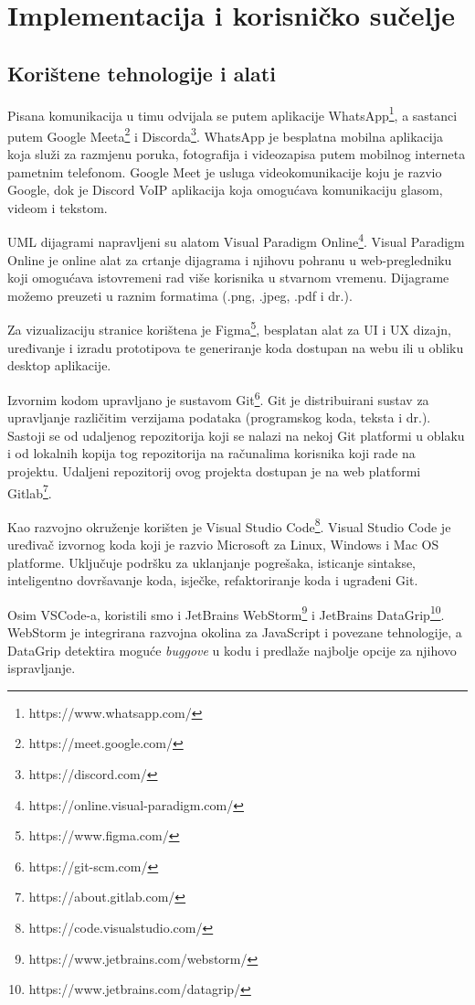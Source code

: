 \chapter{Implementacija i korisničko sučelje}
		
		
		\section{Korištene tehnologije i alati}
		Pisana komunikacija u timu odvijala se putem aplikacije WhatsApp\footnote{https://www.whatsapp.com/}, a sastanci putem Google Meeta\footnote{https://meet.google.com/} i Discorda\footnote{https://discord.com/}. WhatsApp je besplatna mobilna aplikacija koja služi za razmjenu poruka, fotografija i videozapisa putem mobilnog interneta pametnim telefonom. Google Meet je usluga videokomunikacije koju je razvio Google, dok je Discord VoIP aplikacija koja omogućava komunikaciju glasom, videom i tekstom.
		
		UML dijagrami napravljeni su alatom Visual Paradigm Online\footnote{https://online.visual-paradigm.com/}. Visual Paradigm Online je online alat za crtanje dijagrama i njihovu pohranu u web-pregledniku koji omogućava istovremeni rad više korisnika u stvarnom vremenu. Dijagrame možemo preuzeti u raznim formatima (.png, .jpeg, .pdf i dr.).
		
		Za vizualizaciju stranice korištena je Figma\footnote{https://www.figma.com/}, besplatan alat za UI i UX dizajn, uređivanje i izradu	prototipova te generiranje koda dostupan na webu ili u obliku desktop aplikacije.
		
		Izvornim kodom upravljano je sustavom Git\footnote{https://git-scm.com/}. Git je distribuirani sustav za upravljanje različitim	verzijama podataka (programskog koda, teksta i dr.). Sastoji se od udaljenog repozitorija koji se nalazi na nekoj Git platformi u oblaku i od lokalnih kopija tog repozitorija na računalima korisnika koji rade na projektu. Udaljeni repozitorij ovog projekta dostupan je na web platformi Gitlab\footnote{https://about.gitlab.com/}.
		
		Kao razvojno okruženje korišten je Visual Studio Code\footnote{https://code.visualstudio.com/}. Visual Studio Code
		je uređivač izvornog koda koji je razvio Microsoft za Linux, Windows i Mac OS platforme. Uključuje podršku za uklanjanje pogrešaka, isticanje sintakse, inteligentno dovršavanje koda, isječke, refaktoriranje koda i ugrađeni Git.
		
		Osim VSCode-a, koristili smo i JetBrains WebStorm\footnote{https://www.jetbrains.com/webstorm/} i JetBrains DataGrip\footnote{https://www.jetbrains.com/datagrip/}. WebStorm je integrirana razvojna okolina za JavaScript i povezane tehnologije, a DataGrip detektira moguće \textit{buggove} u kodu i predlaže najbolje opcije za njihovo ispravljanje.
		
